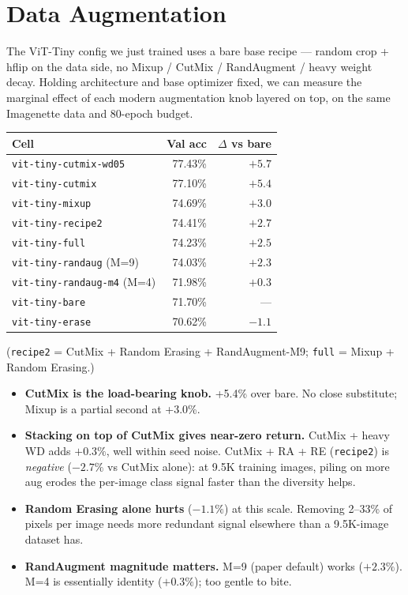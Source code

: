 \section{Data Augmentation}
\label{sec:vit_aug_ablation}

The ViT-Tiny config we just trained uses a bare base recipe ---
random crop + hflip on the data side, no Mixup / CutMix /
RandAugment / heavy weight decay. Holding architecture and base
optimizer fixed, we can measure the marginal effect of each
modern augmentation knob layered on top, on the same Imagenette
data and 80-epoch budget.

\begin{center}
\begin{tabular}{l r r}
\hline
Cell                                & Val acc & $\Delta$ vs bare \\
\hline
\texttt{vit-tiny-cutmix-wd05}       & 77.43\% & $+5.7$ \\
\texttt{vit-tiny-cutmix}            & 77.10\% & $+5.4$ \\
\texttt{vit-tiny-mixup}             & 74.69\% & $+3.0$ \\
\texttt{vit-tiny-recipe2}           & 74.41\% & $+2.7$ \\
\texttt{vit-tiny-full}              & 74.23\% & $+2.5$ \\
\texttt{vit-tiny-randaug} (M=9)     & 74.03\% & $+2.3$ \\
\texttt{vit-tiny-randaug-m4} (M=4)  & 71.98\% & $+0.3$ \\
\texttt{vit-tiny-bare}              & 71.70\% & ---     \\
\texttt{vit-tiny-erase}             & 70.62\% & $-1.1$ \\
\hline
\end{tabular}
\end{center}

(\texttt{recipe2} = CutMix + Random Erasing + RandAugment-M9;
\texttt{full} = Mixup + Random Erasing.)

\begin{itemize}
  \item \textbf{CutMix is the load-bearing knob.} +5.4\% over
    bare. No close substitute; Mixup is a partial second at
    +3.0\%.
  \item \textbf{Stacking on top of CutMix gives near-zero
    return.} CutMix + heavy WD adds $+0.3\%$, well within seed
    noise. CutMix + RA + RE (\texttt{recipe2}) is \emph{negative}
    ($-2.7\%$ vs CutMix alone): at 9.5K training images, piling
    on more aug erodes the per-image class signal faster than
    the diversity helps.
  \item \textbf{Random Erasing alone hurts} ($-1.1\%$) at this
    scale. Removing 2--33\% of pixels per image needs more
    redundant signal elsewhere than a 9.5K-image dataset has.
  \item \textbf{RandAugment magnitude matters.} M=9 (paper
    default) works ($+2.3\%$). M=4 is essentially identity
    ($+0.3\%$); too gentle to bite.
\end{itemize}

